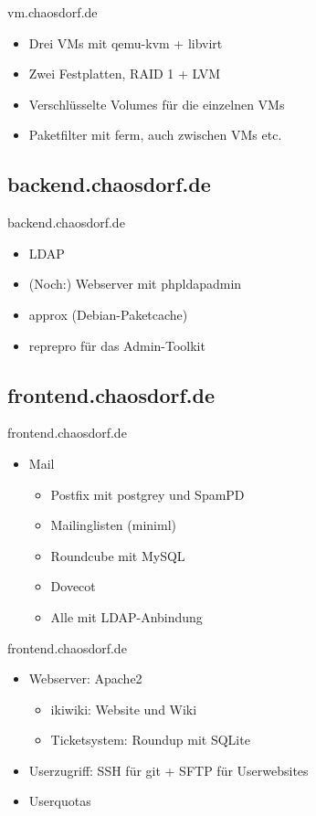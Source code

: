 \documentclass{beamer}
\begin{document}
\begin{frame}{vm.chaosdorf.de}
	\begin{itemize}
		\item Drei VMs mit qemu-kvm + libvirt
		\pause \item Zwei Festplatten, RAID 1 + LVM
		\pause \item Verschlüsselte Volumes für die einzelnen VMs
		\pause \item Paketfilter mit ferm, auch zwischen VMs etc.
	\end{itemize}
\end{frame}

\subsection{backend.chaosdorf.de}
\begin{frame}{backend.chaosdorf.de}
	\begin{itemize}
		\item LDAP
		\item (Noch:) Webserver mit phpldapadmin
		\pause \item approx (Debian-Paketcache)
		\item reprepro für das Admin-Toolkit
	\end{itemize}
\end{frame}

\subsection{frontend.chaosdorf.de}
\begin{frame}{frontend.chaosdorf.de}
	\begin{itemize}
		\item Mail
		\begin{itemize}
			\item Postfix mit postgrey und SpamPD
			\pause \item Mailinglisten (miniml)
			\pause \item Roundcube mit MySQL
			\pause \item Dovecot
			\pause \item Alle mit LDAP-Anbindung
		\end{itemize}
	\end{itemize}
\end{frame}

\begin{frame}{frontend.chaosdorf.de}
	\begin{itemize}
		\item Webserver: Apache2
		\begin{itemize}
			\pause \item ikiwiki: Website und Wiki
			\pause \item Ticketsystem: Roundup mit SQLite
		\end{itemize}
		\pause \item Userzugriff: SSH für git + SFTP für Userwebsites
		\pause \item Userquotas
	\end{itemize}
\end{frame}
\end{document}
